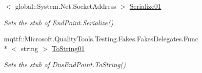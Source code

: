 \begin{DoxyCompactItemize}
$<$ global\-::\-System.\-Net.\-Socket\-Address $>$ \hyperlink{class_system_1_1_net_1_1_fakes_1_1_stub_dns_end_point_aecbe8f8e08ebd5e2f85884730ad47195}{Serialize01}
\begin{DoxyCompactList}\small\item\em Sets the stub of End\-Point.\-Serialize()\end{DoxyCompactList}\item 
mqttf\-::\-Microsoft.\-Quality\-Tools.\-Testing.\-Fakes.\-Fakes\-Delegates.\-Func\\*
$<$ string $>$ \hyperlink{class_system_1_1_net_1_1_fakes_1_1_stub_dns_end_point_ab1aa4ba3b0dcf3e86c810fd828ec7229}{To\-String01}
\begin{DoxyCompactList}\small\item\em Sets the stub of Dns\-End\-Point.\-To\-String()\end{DoxyCompactList}\end{DoxyCompactItemize}
